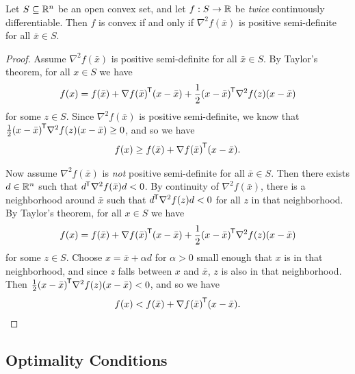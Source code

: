 \begin{thm}
    Let $S \subseteq \mathbb{R}^n$ be an open convex set, and let $f: S \to \mathbb{R}$ be \emph{twice} continuously differentiable. Then $f$ is convex if and only if $\nabla^2f(\bar{x})$ is positive semi-definite for all $\bar{x} \in S$.
\end{thm}

\begin{proof}\proofbreak
    Assume $\nabla^2f(\bar{x})$ is positive semi-definite for all $\bar{x} \in S$. By Taylor's theorem, for all $x \in S$ we have
    \begin{align*}
        f(x) = f(\bar{x}) + {\nabla f(\bar{x})}^{\mkern-1.5mu\mathsf{T}}(x - \bar{x}) + \frac{1}{2}{(x - \bar{x})}^{\mkern-1.5mu\mathsf{T}}\nabla^2f(z)(x - \bar{x})
    \end{align*}
    for some $z \in S$. Since $\nabla^2f(\bar{x})$ is positive semi-definite, we know that $\frac{1}{2}{(x - \bar{x})}^{\mkern-1.5mu\mathsf{T}}\nabla^2f(z)(x - \bar{x}) \geq 0$, and so we have
    \begin{align*}
        f(x) \geq f(\bar{x}) + {\nabla f(\bar{x})}^{\mkern-1.5mu\mathsf{T}}(x - \bar{x}).
    \end{align*}

    Now assume $\nabla^2f(\bar{x})$ is \emph{not} positive semi-definite for all $\bar{x} \in S$. Then there exists $d \in \mathbb{R}^n$ such that ${d}^{\mkern-1.5mu\mathsf{T}}\nabla^2f(\bar{x})d < 0$. By continuity of $\nabla^2f(\bar{x})$, there is a neighborhood around $\bar{x}$ such that ${d}^{\mkern-1.5mu\mathsf{T}}\nabla^2f(z)d < 0$ for all $z$ in that neighborhood. By Taylor's theorem, for all $x \in S$ we have
    \begin{align*}
        f(x) = f(\bar{x}) + {\nabla f(\bar{x})}^{\mkern-1.5mu\mathsf{T}}(x - \bar{x}) + \frac{1}{2}{(x - \bar{x})}^{\mkern-1.5mu\mathsf{T}}\nabla^2f(z)(x - \bar{x})
    \end{align*}
    for some $z \in S$. Choose $x = \bar{x} + \alpha d$ for $\alpha > 0$ small enough that $x$ is in that neighborhood, and since $z$ falls between $x$ and $\bar{x}$, $z$ is also in that neighborhood. Then $\frac{1}{2}{(x - \bar{x})}^{\mkern-1.5mu\mathsf{T}}\nabla^2f(z)(x - \bar{x}) < 0$, and so we have
    \begin{align*}
        f(x) < f(\bar{x}) + {\nabla f(\bar{x})}^{\mkern-1.5mu\mathsf{T}}(x - \bar{x}).
    \end{align*}
\end{proof}

\subsection{Optimality Conditions}

